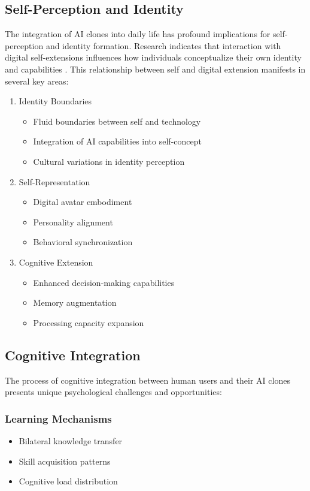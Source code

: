 \subsection{Self-Perception and Identity}

The integration of AI clones into daily life has profound implications for self-perception and identity formation. Research indicates that interaction with digital self-extensions influences how individuals conceptualize their own identity and capabilities \citep{maeda2023self}. This relationship between self and digital extension manifests in several key areas:

\begin{enumerate}
\item Identity Boundaries
\begin{itemize}
\item Fluid boundaries between self and technology
\item Integration of AI capabilities into self-concept
\item Cultural variations in identity perception
\end{itemize}

\item Self-Representation
\begin{itemize}
\item Digital avatar embodiment
\item Personality alignment
\item Behavioral synchronization
\end{itemize}

\item Cognitive Extension
\begin{itemize}
\item Enhanced decision-making capabilities
\item Memory augmentation
\item Processing capacity expansion
\end{itemize}
\end{enumerate}

\subsection{Cognitive Integration}

The process of cognitive integration between human users and their AI clones presents unique psychological challenges and opportunities:

\subsubsection{Learning Mechanisms}
\begin{itemize}
\item Bilateral knowledge transfer
\item Skill acquisition patterns
\item Cognitive load distribution
\end{itemize}

